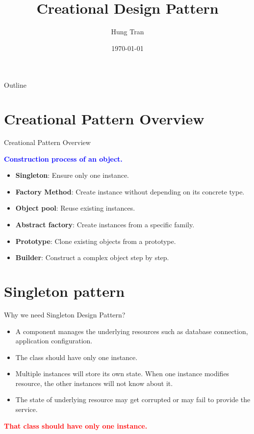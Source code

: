\documentclass[13pt]{beamer}
\title[Design Pattern]{Creational Design Pattern}
\author{Hung Tran}
\institute{Fpt software}
\date{\today}
\begin{document}
\begin{frame}
\titlepage
\end{frame}

\begin{frame}{Outline}
\tableofcontents
\end{frame}

\section{Creational Pattern Overview}

\begin{frame}{Creational Pattern Overview}
	\begin{center}
	\textcolor{blue}{\textbf{Construction process of an object.}}
	\end{center}
	\begin{itemize}
		\setlength\itemsep{1em}
		\item \textbf{Singleton}: Ensure only one instance.
		\item \textbf{Factory Method}: Create instance without depending on its concrete type.
		\item \textbf{Object pool}: Reuse existing instances.
		\item \textbf{Abstract factory}: Create instances from a specific family.
		\item \textbf{Prototype}: Clone existing objects from a prototype.
		\item \textbf{Builder}: Construct a complex object step by step.
	\end{itemize}
\end{frame}

\section{Singleton pattern}

\begin{frame}{Why we need Singleton Design Pattern?}
	\begin{itemize}
		\setlength\itemsep{1em}
		\item A component manages the underlying resources such as database connection, application configuration.
		\item The class should have only one instance.
		\item Multiple instances will store its own state. When one instance modifies resource, the other instances will not know about it. 
		\item The state of underlying resource may get corrupted or may fail to provide the service.
	\end{itemize}
	\begin{center}
	\textcolor{red}{\textbf{That class should have only one instance.}}
	\end{center}
\end{frame}
\end{document}
